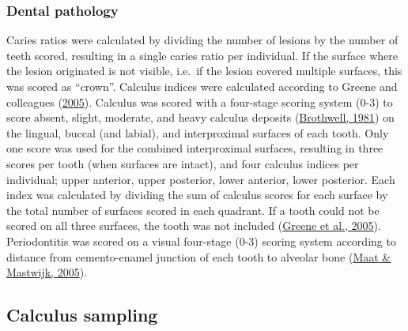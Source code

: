 \documentclass[
  b5paper,
]{book}
\begin{document}
\hypertarget{dental-pathology}{%
\subsubsection{Dental pathology}\label{dental-pathology}}

Caries ratios were calculated by dividing the number of lesions by the
number of teeth scored, resulting in a single caries ratio per
individual. If the surface where the lesion originated is not visible,
i.e.~if the lesion covered multiple surfaces, this was scored as
``crown''. Calculus indices were calculated according to Greene and
colleagues
(\protect\hyperlink{ref-greeneQuantifyingCalculus2005}{2005}). Calculus
was scored with a four-stage scoring system (0-3) to score absent,
slight, moderate, and heavy calculus deposits
(\protect\hyperlink{ref-brothwellDiggingBones1981}{Brothwell, 1981}) on
the lingual, buccal (and labial), and interproximal surfaces of each
tooth. Only one score was used for the combined interproximal surfaces,
resulting in three scores per tooth (when surfaces are intact), and four
calculus indices per individual; upper anterior, upper posterior, lower
anterior, lower posterior. Each index was calculated by dividing the sum
of calculus scores for each surface by the total number of surfaces
scored in each quadrant. If a tooth could not be scored on all three
surfaces, the tooth was not included
(\protect\hyperlink{ref-greeneQuantifyingCalculus2005}{Greene et al.,
2005}). Periodontitis was scored on a visual four-stage (0-3) scoring
system according to distance from cemento-enamel junction of each tooth
to alveolar bone (\protect\hyperlink{ref-maatManualPhysical2005}{Maat \&
Mastwijk, 2005}).

\hypertarget{calculus-sampling}{%
\subsection{Calculus sampling}\label{calculus-sampling}}
\end{document}
